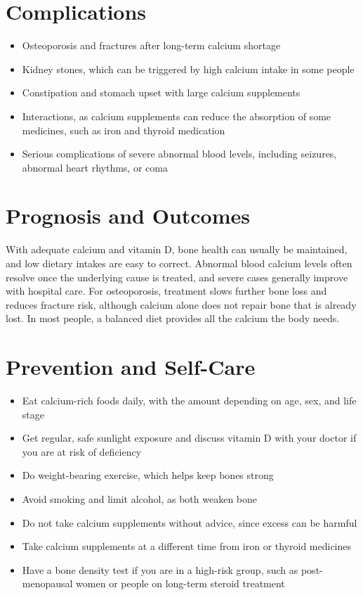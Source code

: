 \section*{Complications}
\begin{itemize}
    \item Osteoporosis and fractures after long-term calcium shortage
    \item Kidney stones, which can be triggered by high calcium intake in some people
    \item Constipation and stomach upset with large calcium supplements
    \item Interactions, as calcium supplements can reduce the absorption of some medicines, such as iron and thyroid medication
    \item Serious complications of severe abnormal blood levels, including seizures, abnormal heart rhythms, or coma
\end{itemize}

\section*{Prognosis and Outcomes}
With adequate calcium and vitamin D, bone health can usually be maintained, and low dietary intakes are easy to correct. Abnormal blood calcium levels often resolve once the underlying cause is treated, and severe cases generally improve with hospital care. For osteoporosis, treatment slows further bone loss and reduces fracture risk, although calcium alone does not repair bone that is already lost. In most people, a balanced diet provides all the calcium the body needs.

\section*{Prevention and Self-Care}
\begin{itemize}
    \item Eat calcium-rich foods daily, with the amount depending on age, sex, and life stage
    \item Get regular, safe sunlight exposure and discuss vitamin D with your doctor if you are at risk of deficiency
    \item Do weight-bearing exercise, which helps keep bones strong
    \item Avoid smoking and limit alcohol, as both weaken bone
    \item Do not take calcium supplements without advice, since excess can be harmful
    \item Take calcium supplements at a different time from iron or thyroid medicines
    \item Have a bone density test if you are in a high-risk group, such as post-menopausal women or people on long-term steroid treatment
\end{itemize}

